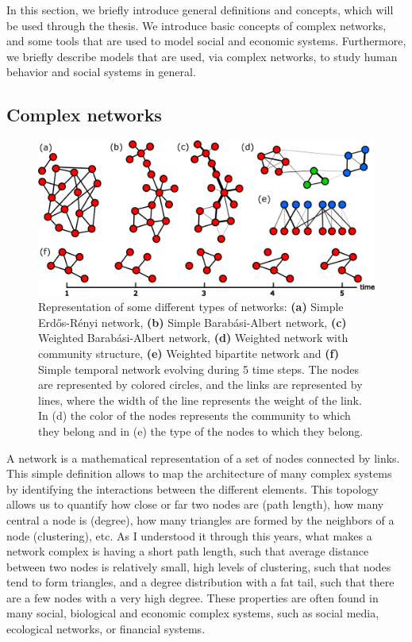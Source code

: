 In this section, we briefly introduce general definitions and concepts, which will be used through the thesis. We introduce basic concepts of complex networks, and some tools that are used to model social and economic systems. Furthermore, we briefly describe models that are used, via complex networks, to study human behavior and social systems in general.

\subsection{\label{subsec:Complex networks} Complex networks}

\begin{figure}
    \centering
    \captionsetup{font=sf}
    \includegraphics[width=\textwidth]{Figs/Introduction/network_plot.pdf}
    \caption[Different network types]{Representation of some different types of networks: \textbf{(a)} Simple Erd\H{o}s-R\'enyi network, \textbf{(b)} Simple Barab\'asi-Albert network, \textbf{(c)} Weighted Barab\'asi-Albert network, \textbf{(d)} Weighted network with community structure, \textbf{(e)} Weighted bipartite network and \textbf{(f)} Simple temporal network evolving during 5 time steps. The nodes are represented by colored circles, and the links are represented by lines, where the width of the line represents the weight of the link. In (d) the color of the nodes represents the community to which they belong and in (e) the type of the nodes to which they belong.}
    \label{fig:netwotk_types}
\end{figure}

A network is a mathematical representation of a set of nodes connected by links. This simple definition allows to map the architecture of many complex systems by identifying the interactions between the different elements. This topology allows us to quantify how close or far two nodes are (path length), how many central a node is (degree), how many triangles are formed by the neighbors of a node (clustering), etc. As I understood it through this years, what makes a network complex is having a short path length, such that average distance between two nodes is relatively small, high levels of clustering, such that nodes tend to form triangles, and a degree distribution with a fat tail, such that there are a few nodes with a very high degree. These properties are often found in many social, biological and economic complex systems, such as social media, ecological networks, or financial systems.

